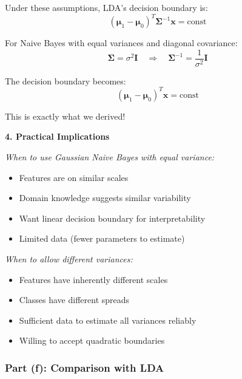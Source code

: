 \documentclass[12pt]{article}
\begin{document}
\begin{explanation}
Under these assumptions, LDA's decision boundary is:
\[
(\boldsymbol{\mu}_1 - \boldsymbol{\mu}_0)^T \boldsymbol{\Sigma}^{-1} \mathbf{x} = \text{const}
\]

For Naive Bayes with equal variances and diagonal covariance:
\[
\boldsymbol{\Sigma} = \sigma^2 \mathbf{I} \quad \Rightarrow \quad \boldsymbol{\Sigma}^{-1} = \frac{1}{\sigma^2}\mathbf{I}
\]

The decision boundary becomes:
\[
(\boldsymbol{\mu}_1 - \boldsymbol{\mu}_0)^T \mathbf{x} = \text{const}
\]

This is exactly what we derived!

\textbf{4. Practical Implications}

\textit{When to use Gaussian Naive Bayes with equal variance:}
\begin{itemize}
    \item Features are on similar scales
    \item Domain knowledge suggests similar variability
    \item Want linear decision boundary for interpretability
    \item Limited data (fewer parameters to estimate)
\end{itemize}

\textit{When to allow different variances:}
\begin{itemize}
    \item Features have inherently different scales
    \item Classes have different spreads
    \item Sufficient data to estimate all variances reliably
    \item Willing to accept quadratic boundaries
\end{itemize}
\end{explanation}

\subsubsection{Part (f): Comparison with LDA}
\end{document}

